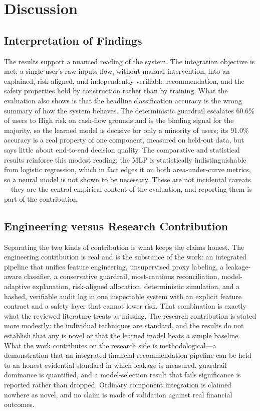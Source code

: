 \section{Discussion}\label{sec:discussion}

\subsection{Interpretation of Findings}\label{subsec:interpretation}
The results support a nuanced reading of the system. The integration objective is met: a
single user's raw inputs flow, without manual intervention, into an explained,
risk-aligned, and independently verifiable recommendation, and the safety properties hold
by construction rather than by training. What the evaluation also shows is that the
headline classification accuracy is the wrong summary of how the system behaves. The
deterministic guardrail escalates 60.6\% of users to High risk on cash-flow grounds and is
the binding signal for the majority, so the learned model is decisive for only a minority
of users; its 91.0\% accuracy is a real property of one component, measured on held-out
data, but says little about end-to-end decision quality. The comparative and statistical
results reinforce this modest reading: the MLP is statistically indistinguishable from
logistic regression, which in fact edges it on both area-under-curve metrics, so a neural
model is not shown to be necessary. These are not incidental caveats---they are the central
empirical content of the evaluation, and reporting them is part of the contribution.

\subsection{Engineering versus Research Contribution}\label{subsec:contribution-framing}
Separating the two kinds of contribution is what keeps the claims honest. The engineering
contribution is real and is the substance of the work: an integrated pipeline that unifies
feature engineering, unsupervised proxy labeling, a leakage-aware classifier, a
conservative guardrail, most-cautious reconciliation, model-adaptive explanation,
risk-aligned allocation, deterministic simulation, and a hashed, verifiable audit log in
one inspectable system with an explicit feature contract and a safety layer that cannot
lower risk. That combination is exactly what the reviewed literature treats as missing. The
research contribution is stated more modestly: the individual techniques are standard, and
the results do not establish that any is novel or that the learned model beats a simple
baseline. What the work contributes on the research side is methodological---a
demonstration that an integrated financial-recommendation pipeline can be held to an honest
evidential standard in which leakage is measured, guardrail dominance is quantified, and a
model-selection result that fails significance is reported rather than dropped. Ordinary
component integration is claimed nowhere as novel, and no claim is made of validation
against real financial outcomes.

